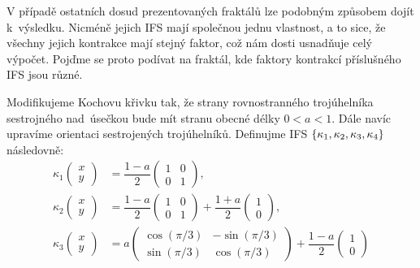 V případě ostatních dosud prezentovaných fraktálů lze podobným způsobem dojít k~výsledku. Nicméně jejich IFS mají společnou jednu vlastnost, a to sice, že všechny jejich kontrakce mají stejný faktor, což nám dosti usnadňuje celý výpočet. Pojďme se proto podívat na fraktál, kde faktory kontrakcí příslušného IFS jsou různé.
\begin{example}\label{ex:modifikovana-kochova-krivka}
    Modifikujeme Kochovu křivku tak, že strany rovnostranného trojúhelníka sestrojného nad~úsečkou bude mít stranu obecné délky $0<a<1$. Dále navíc upravíme orientaci sestrojených trojúhelníků. Definujme IFS $\left\{\kappa_1,\kappa_2,\kappa_3,\kappa_4\right\}$ následovně:
    \begin{align*}
        \kappa_1\left(\begin{matrix}
            x\\
            y
        \end{matrix}\right)&=\dfrac{1-a}{2}\left(\begin{matrix}
            1 & 0\\
            0 & 1
        \end{matrix}\right),\\
        \kappa_2\left(\begin{matrix}
            x\\
            y
        \end{matrix}\right)&=\dfrac{1-a}{2}\left(\begin{matrix}
            1 & 0\\
            0 & 1
        \end{matrix}\right)+\dfrac{1+a}{2}\left(\begin{matrix}
            1\\
            0
        \end{matrix}\right),\\
        \kappa_3\left(\begin{matrix}
            x\\
            y
        \end{matrix}\right)&=a\left(\begin{matrix}
            \cos(\pi/3) & -\sin(\pi/3)\\
            \sin(\pi/3) & \cos(\pi/3)
        \end{matrix}\right)+\dfrac{1-a}{2}\left(\begin{matrix}
            1\\
            0
        \end{matrix}\right)\\

\end{align*}
\end{example}
